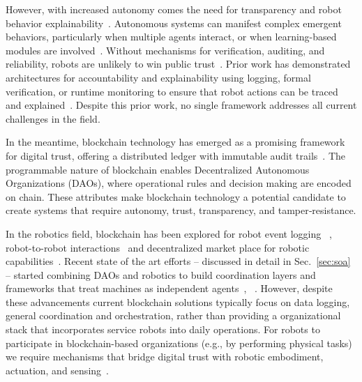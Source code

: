 \documentclass[letterpaper, 10 pt, conference]{ieeeconf}  %
\begin{document}
However, with increased autonomy comes the need for transparency and robot behavior explainability~\cite{Winfield2017}. Autonomous systems can manifest complex emergent behaviors, particularly when multiple agents interact, or when learning-based modules are involved~\cite{castello2016adaptive}. Without mechanisms for verification, auditing, and reliability, robots are unlikely to win public trust~\cite{Winfield2017}. Prior work has demonstrated architectures for accountability and explainability using logging, formal verification, or runtime monitoring to ensure that robot actions can be traced and explained~\cite{Mayoral2018}. Despite this prior work, no single framework addresses all current challenges in the field.

In the meantime, blockchain technology has emerged as a promising framework for digital trust, offering a distributed ledger with immutable audit trails~\cite{Castello-trust}. The programmable nature of blockchain enables Decentralized Autonomous Organizations (DAOs), where operational rules and decision making are encoded on chain. These attributes make blockchain technology a potential candidate to create systems that require autonomy, trust, transparency, and tamper‐resistance. 

In the robotics field, blockchain has been explored for robot event logging~\cite{ferrer2018robochain} , robot-to-robot interactions~\cite{danilov2018robonomics}  and  decentralized market place for robotic capabilities~\cite{peaq_machine_economy}. Recent state of the art efforts -- discussed in detail in Sec.~\ref{sec:soa} --  started combining DAOs and robotics to build coordination layers and frameworks that treat machines as independent agents~\cite{openmind2023fabric}, ~\cite{symbiotic2024sharedsecurity}. However, despite these advancements current blockchain solutions typically focus on data logging, general coordination and orchestration, rather than providing a organizational stack that incorporates service robots into daily operations. For robots to participate in blockchain-based organizations (e.g., by performing physical tasks) we require mechanisms that bridge digital trust with robotic embodiment, actuation, and sensing~\cite{Castello-trust}.
\end{document}
